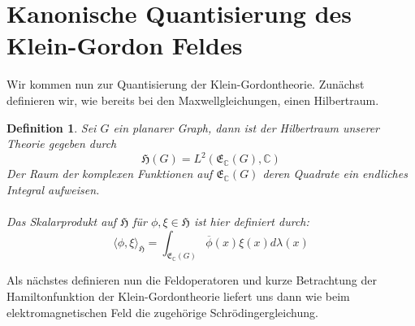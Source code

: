 \documentclass[11pt,a4paper,leqno]{report}
\newtheorem{definition}[theorem]{Definition}
\numberwithin{equation}{chapter}
\begin{document}
\section{Kanonische Quantisierung des Klein-Gordon Feldes}
Wir kommen nun zur Quantisierung der Klein-Gordontheorie.
Zun\"achst definieren wir, wie bereits bei den Maxwellgleichungen, einen Hilbertraum.
\begin{definition}
	Sei $G$ ein planarer Graph, dann ist der Hilbertraum unserer Theorie gegeben durch
	\begin{equation}
		\mathfrak{H}(G) = L^2(\mathfrak{E}_\mathbb{C}(G),\mathbb{C})
	\end{equation}
	Der Raum der komplexen Funktionen auf $\mathfrak{E}_\mathbb{C}(G)$ deren Quadrate ein endliches Integral aufweisen.\\
	\\
	Das Skalarprodukt auf $\mathfrak{H}$ f\"ur $\phi,\xi\in \mathfrak{H}$ ist hier definiert durch:
	\begin{equation}
		\langle \phi, \xi\rangle_{\mathfrak{H}} = \int_{\mathfrak{E}_\mathbb{C}(G)} \overline{\phi}(x)\xi(x)d\lambda(x)
	\end{equation}
\end{definition}
\noindent
Als n\"achstes definieren nun die Feldoperatoren und kurze Betrachtung der Hamiltonfunktion der Klein-Gordontheorie liefert uns dann wie beim elektromagnetischen Feld die zugeh\"orige Schr\"odingergleichung.
\end{document}
